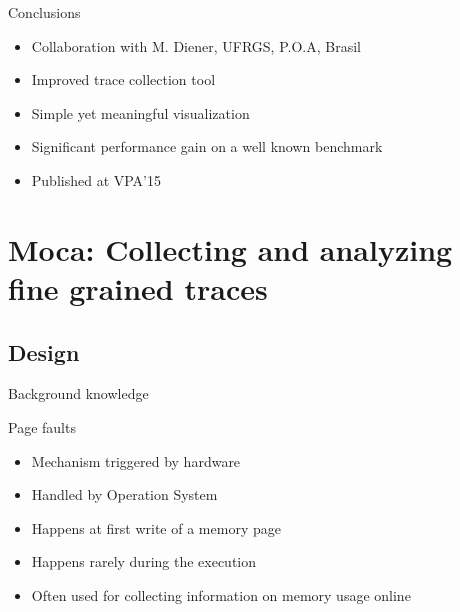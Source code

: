 \documentclass[xcolor={usenames,dvipsnames},hyperref={pdfusetitle}]{beamer}
\begin{document}
\begin{frame}{Conclusions}
    \begin{itemize}[<+-|alert@+>]
        \item Collaboration with M. Diener, UFRGS, P.O.A, Brasil
        \item Improved trace collection tool
        \item Simple yet meaningful visualization
        \item Significant performance gain on a well known benchmark
        \item Published at VPA'15~\cite{Beniamine15TABARNAC}
    \end{itemize}
\end{frame}

\section{Moca: Collecting and analyzing fine grained traces}

\subsection{Design}

\begin{frame}{Background knowledge}
    \begin{block}{Page faults}
        \begin{itemize}
            \item Mechanism triggered by hardware
            \item Handled by Operation System
            \item Happens at first write of a memory page
            \item Happens rarely during the execution
            \item Often used for collecting information on memory usage online
        \end{itemize}
    \end{block}
\end{frame}
\end{document}
